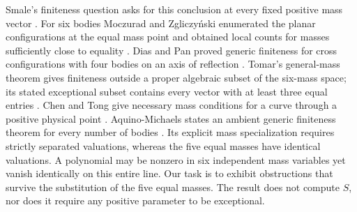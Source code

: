\documentclass[11pt,letterpaper]{article}
\theoremstyle{definition}
\begin{document}
Smale's finiteness question asks for this conclusion at every fixed positive mass vector \cite{Smale}. For six bodies Moczurad and Zgliczy\'nski enumerated the planar configurations at the equal mass point and obtained local counts for masses sufficiently close to equality \cite{MZplanar,MZnear}. Dias and Pan proved generic finiteness for cross configurations with four bodies on an axis of reflection \cite{DP}. Tomar's general-mass theorem gives finiteness outside a proper algebraic subset of the six-mass space; its stated exceptional subset contains every vector with at least three equal entries \cite[Theorem 1.1 and Remark 6.14]{Tomar}. Chen and Tong give necessary mass conditions for a curve through a positive physical point \cite[Thm.~1.1, Cor.~1.2]{CT}. Aquino-Michaels states an ambient generic finiteness theorem for every number of bodies \cite[Thms.~1.1--1.3]{GenericN}. Its explicit mass specialization requires strictly separated valuations, whereas the five equal masses have identical valuations. A polynomial may be nonzero in six independent mass variables yet vanish identically on this entire line. Our task is to exhibit obstructions that survive the substitution of the five equal masses. The result does not compute $S$, nor does it require any positive parameter to be exceptional.
\end{document}
